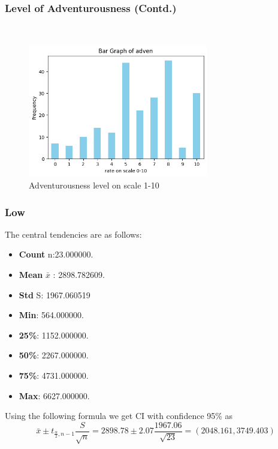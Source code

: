 \documentclass{beamer}
\begin{document}
\begin{frame}
    \frametitle{Level of Adventurousness (Contd.) }\
    \begin{figure}
    \centering
    \includegraphics[width=0.7\textwidth]{output_57_0.png} %
    \caption{Adventurousness level on scale 1-10 } %
    \label{fig:Percentage Distribution of Cuisine} %
    \end{figure}
\end{frame}

\begin{frame}
\frametitle{Low}
The central tendencies are as follows:
    \begin{block}{}
        \begin{itemize}
            \item \textbf{Count} n:23.000000.
            \item \textbf{Mean} $\bar{x}$ : 2898.782609.
            \item \textbf{Std} S: 1967.060519
            \item \textbf{Min}: 564.000000.
            \item \textbf{25\%}: 1152.000000.
            \item \textbf{50\%}: 2267.000000.
            \item \textbf{75\%}: 4731.000000.
            \item \textbf{Max}: 6627.000000.
        \end{itemize}
    \end{block}
    Using the following formula we get CI with confidence 95\% as
        \begin{equation}
        \bar{x} \pm t_{\frac{\alpha}{2}, n-1} \frac{S}{\sqrt{n}} =
        2898.78 \pm 2.07 \frac{1967.06}{\sqrt{23}}  = (2048.161,3749.403)
        \end{equation}
        
\end{frame}
\end{document}
